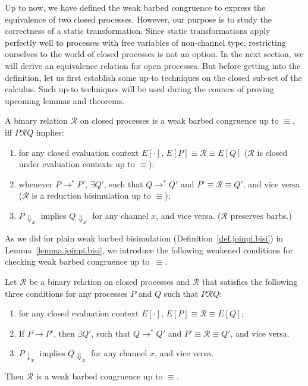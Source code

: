 \documentclass{LMCS}
\renewcommand{\_}{\mathord{\rule[-.25ex]{1ex}{.15ex}}}
\newcommand{\reduces}{\longrightarrow}
\newcommand{\R}{\mathrel{\mathcal{R}}}
\newcommand{\weakbarb}[2]{#1\!\Downarrow_{#2}}
\newcommand{\barb}[2]{#1\!\downarrow_{#2}}
\newcommand{\econtext}[1]{E[#1]}
\begin{document}
Up to now, we have defined the weak barbed congruence to express the
equivalence of two closed processes. However, our purpose is to study
the correctness of a static transformation. Since static
transformations apply perfectly well to processes with free
variables of non-channel type, restricting ourselves to the world of
closed processes is not an option. In the next section, we will derive
an equivalence relation for open processes. But before getting into
the definition, let us first establish some up-to techniques on the
closed sub-set of the calculus. Such up-to techniques will be used
during the courses of proving upcoming lemmas and theorems.

\begin{defi}
\label{def.wbc-upto-equiv}
A binary relation $\R$ on closed processes is a weak barbed congruence
up to $\equiv$, iff $P\R Q$ implies:
  \begin{enumerate}[(1)]
  \item for any closed evaluation context $\econtext{\cdot}$,
    $\econtext{P} \equiv\R \equiv\econtext{Q}$ ($\R$ is closed
    under evaluation contexts up to $\equiv$);
  \item whenever $P \reduces^{*} P'$, $\exists Q'$, such that $Q
    \reduces^* Q'$ and $P' \equiv\R\equiv Q'$, and vice versa ($\R$ is
    a reduction bisimulation up to $\equiv$);
  \item $\weakbarb{P}{x}$ implies $\weakbarb{Q}{x}$ for any channel
    $x$, and vice versa. ($\R$ preserves barbs.)
  \end{enumerate}
\end{defi}
As we did for plain weak barbed bisimulation
(Definition~\ref{def.joinpi.bisi})
in Lemma~\ref{lemma.joinpi.bisi}, we introduce the following
weakened conditions for checking weak barbed congruence up to~$\equiv$.
\begin{lem}\label{lemma.wbc-upto-equiv-alt}
  Let $\R$ be a binary relation on closed processes and $\R$ that satisfies the
  following three conditions for any processes $P$ and $Q$ such that
  $P\R Q$:
  \begin{enumerate}[\em(1)]
  \item for any closed evaluation context $\econtext{\cdot}$,
    $\econtext{P} \equiv\R \equiv\econtext{Q}$;
  \item If $P\reduces P'$, then $\exists Q'$, such that $Q\reduces^*
    Q'$ and $P'\equiv\R\equiv Q'$, and vice versa.
  \item $\barb{P}{x}$ implies $\weakbarb{Q}{x}$ for any channel $x$,
    and vice versa.
  \end{enumerate}
  Then $\R$ is a weak barbed congruence up to $\equiv$.
\end{lem}
\end{document}
